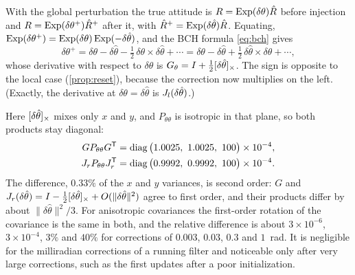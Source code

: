 \begin{solutions}
  \item With the global perturbation the true attitude is $R = \operatorname{Exp}(\delta\theta)\hat R$ before injection and $R = \operatorname{Exp}(\delta\theta^+)\hat R^+$ after it, with
        $\hat R^+ = \operatorname{Exp}(\delta\hat\theta)\hat R$. Equating, $\operatorname{Exp}(\delta\theta^+) = \operatorname{Exp}(\delta\theta)\operatorname{Exp}(-\delta\hat\theta)$, and the BCH formula \eqref{eq:bch} gives
        \[
          \delta\theta^+ = \delta\theta - \delta\hat\theta - \tfrac12\,\delta\theta\times\delta\hat\theta + \cdots = \delta\theta - \delta\hat\theta + \tfrac12\,\delta\hat\theta\times\delta\theta + \cdots,
        \]
        whose derivative with respect to $\delta\theta$ is $G_\theta = I + \tfrac12[\delta\hat\theta]_{\times}$. The sign is opposite to the local case
        (\cref{prop:reset}), because the correction now multiplies on the left. (Exactly, the derivative at $\delta\theta = \delta\hat\theta$ is $J_l(\delta\hat\theta)$.)

  \item Here $[\delta\hat\theta]_{\times}$ mixes only $x$ and $y$, and $P_{\theta\theta}$ is isotropic in that plane, so both products stay diagonal:
        \begin{align*}
          GP_{\theta\theta}G\T &= \diag\big(1.0025,\ 1.0025,\ 100\big)\times10^{-4}, \\
          \Jr P_{\theta\theta}\Jr\T &= \diag\big(0.9992,\ 0.9992,\ 100\big)\times10^{-4}.
        \end{align*}
        The difference, $0.33\%$ of the $x$ and $y$ variances, is second order: $G$ and $J_r(\delta\hat\theta) = I - \tfrac12[\delta\hat\theta]_{\times} + O(\|\delta\hat\theta\|^2)$ agree to
        first order, and their products differ by about $\|\delta\hat\theta\|^2/3$. For anisotropic covariances the first-order rotation of the covariance is the
        same in both, and the relative difference is about $3\times10^{-6}$, $3\times10^{-4}$, $3\%$ and $40\%$ for corrections of $0.003$, $0.03$, $0.3$ and $1$~rad. It
        is negligible for the milliradian corrections of a running filter and noticeable only after very large corrections, such as the first updates
        after a poor initialization.


\end{solutions}
